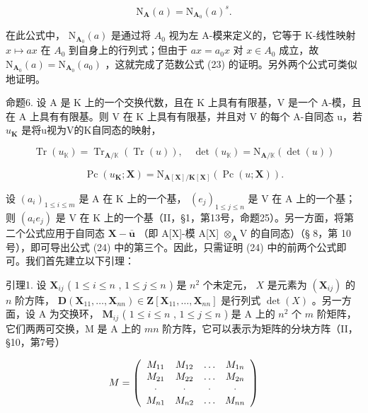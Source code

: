 \[
\mathrm{N} _ {\mathbf {A}} (a) = \mathrm{N} _ {\mathbf {A} _ {0}} (a) ^ {s}.
\]

在此公式中， \(\mathrm{N}_{\mathbf{A}_{0}}(a)\) 是通过将 \(A_{0}\) 视为左 A-模来定义的，它等于 K-线性映射 \(x \mapsto ax\) 在 \(A_{0}\) 到自身上的行列式；但由于 \(ax = a_{0}x\) 对 \(x \in A_{0}\) 成立，故 \(\mathrm{N}_{\mathbf{A}_{0}}(a) = \mathrm{N}_{\mathbf{A}_{0}}(a_{0})\) ，这就完成了范数公式 (23) 的证明。另外两个公式可类似地证明。

命题6. 设 A 是 K 上的一个交换代数，且在 K 上具有有限基，V 是一个 A-模，且在 A 上具有有限基。则 V 在 K 上具有有限基，并且对 V 的每个 A-自同态 u，若 \(u_{\mathbf{K}}\) 是将u视为V的K自同态的映射，

\[
\operatorname{Tr} (u _ {\mathbb {K}}) = \operatorname{Tr} _ {\mathbf {A} / \mathbb {K}} (\operatorname{Tr} (u)), \quad \det (u _ {\mathbb {K}}) = \mathrm{N} _ {\mathbf {A} / \mathbb {K}} (\det (u))\tag{24}
\]

\[
\operatorname{Pc} (u _ {\mathbf {K}}; \mathbf {X}) = \mathrm{N} _ {\mathbf {A} [ \mathbf {X} ] / \mathbf {K} [ \mathbf {X} ]} (\operatorname{Pc} (u; \mathbf {X})).
\]

设 \((a_{i})_{1\leqslant i\leqslant m}\) 是 A 在 K 上的一个基， \((e_{j})_{1\leqslant j\leqslant n}\) 是 V 在 A 上的一个基；则 \((a_{i}e_{j})\) 是 V 在 K 上的一个基（II，§1，第13号，命题25）。另一方面，将第二个公式应用于自同态 \(\mathbf{X} - \bar{\boldsymbol{u}}\) （即 A{[}X{]}-模 A{[}X{]} \(\otimes_{\mathbf{A}}\mathrm{V}\) 的自同态）（§ 8，第 10 号），即可导出公式 (24) 中的第三个。因此，只需证明 (24) 中的前两个公式即可。我们首先建立以下引理：

引理1. 设 \(\mathbf{X}_{ij}\) ( \(1 \leqslant i \leqslant n\) , \(1 \leqslant j \leqslant n\) ) 是 \(n^2\) 个未定元， \(X\) 是元素为 \((\mathbf{X}_{ij})\) 的 \(n\) 阶方阵， \(\mathbf{D}(\mathbf{X}_{11}, \ldots, \mathbf{X}_{nn}) \in \mathbf{Z}[\mathbf{X}_{11}, \ldots, \mathbf{X}_{nn}]\) 是行列式 \(\det(X)\) 。另一方面，设 A 为交换环， \(\mathbf{M}_{ij}\) ( \(1 \leqslant i \leqslant n\) , \(1 \leqslant j \leqslant n\) ) 是 A 上的 \(n^2\) 个 \(m\) 阶矩阵，它们两两可交换，M 是 A 上的 \(mn\) 阶方阵，它可以表示为矩阵的分块方阵（II，§10，第7号）

\[
M = \left( \begin{array}{c c c c} M _ {1 1} & M _ {1 2} & \ldots & M _ {1 n} \\ M _ {2 1} & M _ {2 2} & \ldots & M _ {2 n} \\ \cdot & \cdot & \cdot & \cdot \\ M _ {n 1} & M _ {n 2} & \ldots & M _ {n n} \end{array} \right)
\]

